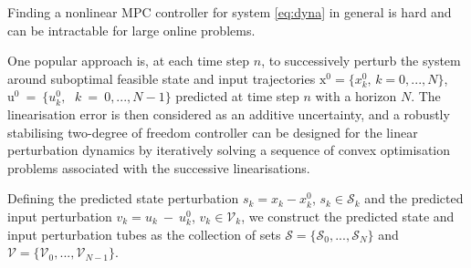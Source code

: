 \documentclass[letterpaper, 10 pt, conference]{ieeeconf}
\begin{document}
Finding a nonlinear MPC controller for system \eqref{eq:dyna} in general is hard and can be intractable for large online problems. 

One popular approach is, at each time step $n$, to successively perturb the system around suboptimal feasible state and input trajectories $\bm{\mathrm{x}}^0 = \{x_k^0, \, k=0, ..., N\}$, $\bm{\mathrm{u}}^0~=~\{u_k^0,~\,~k~=~0, ..., N-1\}$ predicted at time step $n$ with a horizon $N$. The linearisation error is then considered as an additive uncertainty, and a robustly stabilising two-degree of freedom controller can be designed for the linear  perturbation dynamics by iteratively solving a sequence of convex optimisation problems associated with the successive linearisations.  

Defining the predicted state perturbation $s_k = x_k - x^0_k$, $s_k \in \mathcal{S}_k$ and the predicted input perturbation $v_k = u_k~-~u^0_k$, $v_k \in \mathcal{V}_k$, we construct the predicted state and input perturbation tubes as the collection of sets $\mathcal{S}=\{\mathcal{S}_0, ..., \mathcal{S}_N\}$ and $\mathcal{V}=\{\mathcal{V}_0, ..., \mathcal{V}_{N-1}\}$. 
\end{document}
